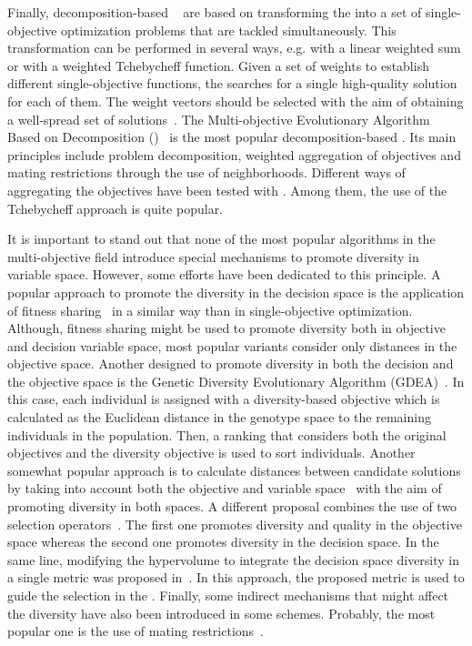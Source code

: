 Finally, decomposition-based \MOEAS{}~\cite{Joel:MOEAD_AMS} are based on transforming the \MOP{} into a set of 
single-objective optimization problems that are tackled simultaneously.
%
This transformation can be performed in several ways, e.g. with a linear weighted sum or with a weighted Tchebycheff function. 
%
Given a set of weights to establish different single-objective functions, the \MOEA{} searches for a single 
high-quality solution for each of them. 
%
The weight vectors should be selected with the aim of obtaining a well-spread set of solutions~\cite{Joel:Kalyanmoy}.
%
The Multi-objective Evolutionary Algorithm Based on Decomposition (\MOEAD{})~\cite{Joel:MOEAD} is the most popular 
decomposition-based \MOEA{}. 
%
Its main principles include problem decomposition, weighted aggregation of objectives and mating restrictions 
through the use of neighborhoods. 
%
Different ways of aggregating the objectives have been tested with \MOEAD{}.
%
Among them, the use of the Tchebycheff approach is quite popular. 
%
 
It is important to stand out that none of the most popular algorithms in the multi-objective field introduce special 
mechanisms to promote diversity in variable space.
%
However, some efforts have been dedicated to this principle.
%
A popular approach to promote the diversity in the decision space is the application of fitness sharing~\cite{Joel:NPGA} 
in a similar way than in single-objective optimization.
%
Although, fitness sharing might be used to promote diversity both in objective and decision variable space, most
popular variants consider only distances in the objective space.
%
Another \MOEA{} designed to promote diversity in both the decision and the objective space is the Genetic
Diversity Evolutionary Algorithm (GDEA)~\cite{toffolo2003genetic}.
%
In this case, each individual is assigned with a diversity-based objective which is calculated as the
Euclidean distance in the genotype space to the remaining individuals in the population.
%
Then, a ranking that considers both the original objectives and the diversity objective is used
to sort individuals.
%
Another somewhat popular approach is to calculate distances between candidate solutions by taking
into account both the objective and variable space~\cite{deb2005omni,shir2009enhancing} with the aim
of promoting diversity in both spaces.
%
A different proposal combines the use of two selection operators~\cite{chan2005evolutionary}.
%
The first one promotes diversity and quality in the objective space whereas the second one promotes diversity in the decision space.
%
In the same line, modifying the hypervolume to integrate the decision space diversity in a single metric was proposed in~\cite{ulrich2010integrating}.
%
In this approach, the proposed metric is used to guide the selection in the \MOEA{}.
%
Finally, some indirect mechanisms that might affect the diversity have also been introduced in some schemes.
%
Probably, the most popular one is the use of mating restrictions~\cite{Joel:STUDY_MATTING_RESTRICTION,Joel:MOEAD_AMS}.


